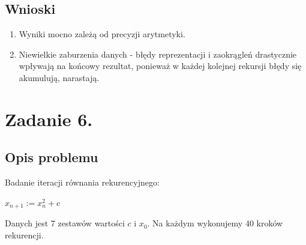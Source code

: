 \documentclass[12pt]{article}
\begin{document}
\subsection{Wnioski}
\begin{enumerate}
  \item Wyniki mocno zależą od precyzji arytmetyki.
  \item Niewielkie zaburzenia danych - błędy reprezentacji i zaokrągleń drastycznie wpływają na końcowy rezultat,
  ponieważ w każdej kolejnej rekursji błędy się akumulują, narastają. 
\end{enumerate}

\section{Zadanie 6.}

\subsection{Opis problemu}
Badanie iteracji równania rekurencyjnego:
\begin{center}
  $ x_{n+1} := x_n^2 + c$
\end{center}
Danych jest 7 zestawów wartości $c$ i $x_0$. Na każdym wykonujemy 40 kroków rekurencji.
\end{document}
